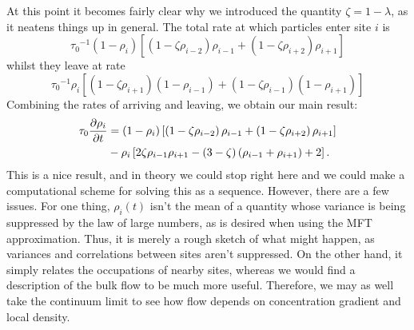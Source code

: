 At this point it becomes fairly clear why we introduced the quantity $\zeta = 1-\lambda$, as it neatens things up in general. The total rate at which particles enter site $i$ is
\begin{equation}
 {\tau_0}^{-1} \left(1-\rho_i \right) \left[ \left(1-\zeta \rho_{i-2} \right) \rho_{i-1} + \left(1-\zeta \rho_{i+2} \right) \rho_{i+1} \right]
\end{equation}
whilst they leave at rate
\begin{equation}
 {\tau_0}^{-1} \rho_i \left[ \left(1-\zeta \rho_{i+1} \right) \left(1 - \rho_{i-1} \right) + \left(1-\zeta \rho_{i-1} \right) \left(1 - \rho_{i+1} \right) \right]
\end{equation}
Combining the rates of arriving and leaving, we obtain our main result:
\begin{align}
\label{eq:latticeMFT}
\begin{split}
 \tau_0 \frac{\partial \rho_i}{\partial t} &= \left( 1-\rho_i \right) \left[ \left(1-\zeta\rho_{i-2} \right) \rho_{i-1} + \left(1-\zeta\rho_{i+2} \right) \rho_{i+1} \right] \\
 &- \rho_i \left[ 2 \zeta \rho_{i-1} \rho_{i+1}  - (3-\zeta)\left(\rho_{i-1} + \rho_{i+1}\right) + 2 \right].
 \end{split}
 \end{align}
This is a nice result, and in theory we could stop right here and we could make a computational scheme for solving this as a sequence. However, there are a few issues. For one thing, $\rho_i (t)$ isn't the mean of a quantity
whose variance is being suppressed by the law of large numbers, as is desired when using the MFT approximation.
Thus, it is merely a rough sketch of what might happen, as variances and correlations between sites aren't suppressed. On the other hand, it simply relates the occupations of nearby sites,
whereas we would find a description of the bulk flow to be much more useful. Therefore, we may as well take the continuum limit to see how flow depends on concentration gradient and local density.

